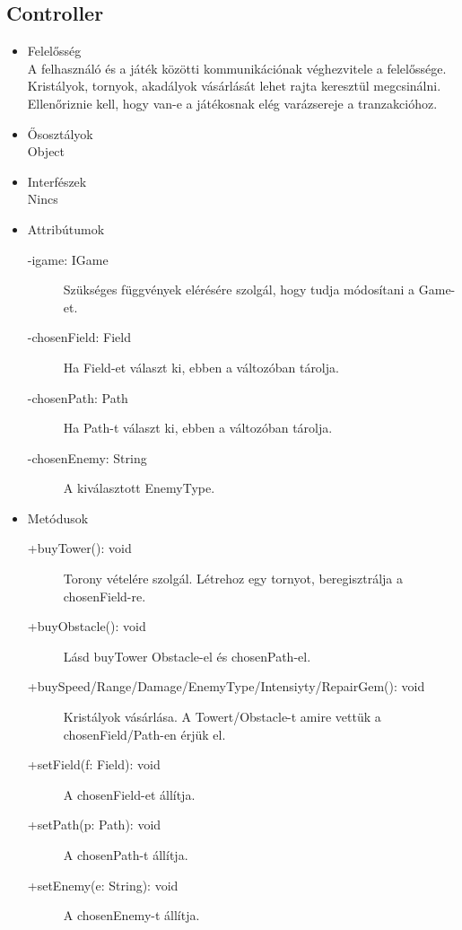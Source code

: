\subsection{Controller}
\begin{itemize}
\item Felelősség\\
A felhasználó és a játék közötti kommunikációnak véghezvitele a felelőssége. Kristályok, tornyok, akadályok vásárlását lehet rajta keresztül megcsinálni. Ellenőriznie kell, hogy van-e a játékosnak elég varázsereje a tranzakcióhoz.
\item Ősosztályok\\
Object
\item Interfészek\\
Nincs
\item Attribútumok\\
	\begin{description}
		\item[-igame: IGame] Szükséges függvények elérésére szolgál, hogy tudja módosítani a Game-et. 
		\item[-chosenField: Field] Ha Field-et választ ki, ebben a változóban tárolja. 
		\item[-chosenPath: Path] Ha Path-t választ ki, ebben a változóban tárolja. 
		\item[-chosenEnemy: String] A kiválasztott EnemyType. 

		
	\end{description}
\item Metódusok\\
	\begin{description}
		
		\item[+buyTower(): void] Torony vételére szolgál. Létrehoz egy tornyot, beregisztrálja a chosenField-re. 
		\item[+buyObstacle(): void] Lásd buyTower Obstacle-el és chosenPath-el. 
		\item[+buySpeed/Range/Damage/EnemyType/Intensiyty/RepairGem(): void] Kristályok vásárlása. A Towert/Obstacle-t amire vettük a chosenField/Path-en érjük el. 
		\item[+setField(f: Field): void] A chosenField-et állítja. 
		\item[+setPath(p: Path): void] A chosenPath-t állítja. 
		\item[+setEnemy(e: String): void] A chosenEnemy-t állítja. 
		
		
		
	\end{description}
\end{itemize}

